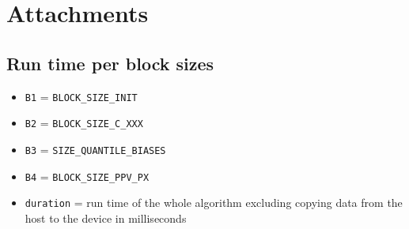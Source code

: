\documentclass{article}
\begin{document}
\newpage
\printbibliography

\newpage
\section{Attachments}

\subsection{Run time per block sizes}
\label{tbl:runtimeperblocksizes}

\begin{itemize}
    \item \texttt{B1} = \texttt{BLOCK_SIZE_INIT}
    \item \texttt{B2} = \texttt{BLOCK_SIZE_C_XXX}
    \item \texttt{B3} = \texttt{SIZE_QUANTILE_BIASES}
    \item \texttt{B4} = \texttt{BLOCK_SIZE_PPV_PX}
    \item \texttt{duration} = run time of the whole algorithm excluding copying data from the host to the device in milliseconds
\end{itemize}
\end{document}
